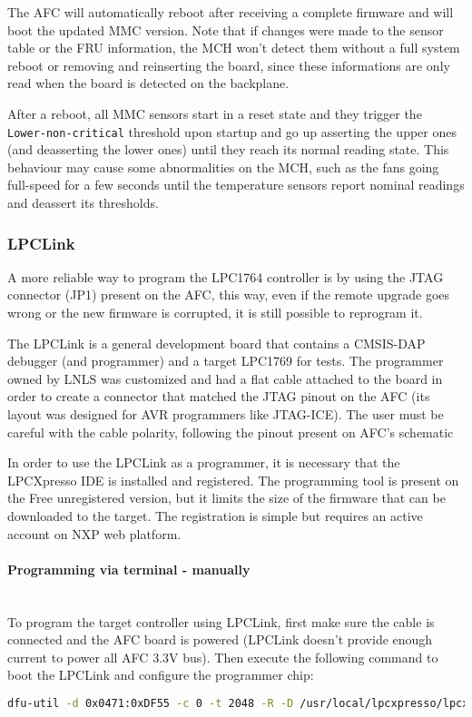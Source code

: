 \documentclass[letterpaper,12pt, titlepage]{article}
\newcommand{\newparagraph}[1]{\paragraph{#1}\mbox{}\\}
\begin{document}
The AFC will automatically reboot after receiving a complete firmware and will boot the updated MMC version. Note that if changes were made to the sensor table or the FRU information, the MCH won't detect them without a full system reboot or removing and reinserting the board, since these informations are only read when the board is detected on the backplane.

After a reboot, all MMC sensors start in a reset state and they trigger the \texttt{Lower-non-critical} threshold upon startup and go up asserting the upper ones (and deasserting the lower ones) until they reach its normal reading state.
This behaviour may cause some abnormalities on the MCH, such as the fans going full-speed for a few seconds until the temperature sensors report nominal readings and deassert its thresholds.


\subsubsection{LPCLink}
A more reliable way to program the LPC1764 controller is by using the JTAG connector (JP1) present on the AFC, this way, even if the remote upgrade goes wrong or the new firmware is corrupted, it is still possible to reprogram it.

The LPCLink is a general development board that contains a CMSIS-DAP debugger (and programmer) and a target LPC1769 for tests. The programmer owned by LNLS was customized and had a flat cable attached to the board in order to create a connector that matched the JTAG pinout on the AFC (its layout was designed for AVR programmers like JTAG-ICE).
The user must be careful with the cable polarity, following the pinout present on AFC's schematic \cite{afc-schema}

In order to use the LPCLink as a programmer, it is necessary that the LPCXpresso IDE is installed and registered. The programming tool is present on the Free unregistered version, but it limits the size of the firmware that can be downloaded to the target. The registration is simple but requires an active account on NXP web platform.

\newparagraph{Programming via terminal - manually}
To program the target controller using LPCLink, first make sure the cable is connected and the AFC board is powered (LPCLink doesn't provide enough current to power all AFC 3.3V bus). Then execute the following command to boot the LPCLink and configure the programmer chip:

\begin{lstlisting}[language=bash]
  dfu-util -d 0x0471:0xDF55 -c 0 -t 2048 -R -D /usr/local/lpcxpresso/lpcxpresso/bin/LPCXpressoWIN.enc
\end{lstlisting}
\end{document}
